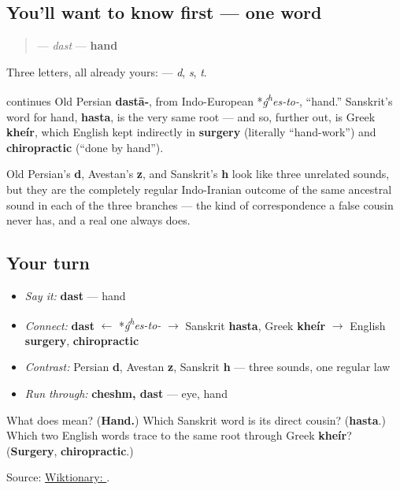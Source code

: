 \subsection*{You'll want to know first — one word}
\begin{quote}
\textbf{} — \emph{dast} — \textbf{hand}
\end{quote}

Three letters, all already yours: \textbf{  } — \emph{d}, \emph{s}, \emph{t}.

\begin{cousinweb}
\textbf{} continues Old Persian \textbf{dastā-}, from Indo-European *\emph{ǵ\textsuperscript{h}es-to-}, “hand.” Sanskrit's word for hand, \textbf{hasta}, is the very same root — and so, further out, is Greek \textbf{kheír}, which English kept indirectly in \textbf{surgery} (literally “hand-work”) and \textbf{chiropractic} (“done by hand”).

Old Persian's \textbf{d}, Avestan's \textbf{z}, and Sanskrit's \textbf{h} look like three unrelated sounds, but they are the completely regular Indo-Iranian outcome of the same ancestral sound in each of the three branches — the kind of correspondence a false cousin never has, and a real one always does.
\end{cousinweb}

\subsection*{Your turn}
\begin{itemize}
\raggedright
  \item \emph{Say it:} \textbf{dast} — hand
  \item \emph{Connect:} \textbf{dast} $\leftarrow$ *\emph{ǵ\textsuperscript{h}es-to-} $\to$ Sanskrit \textbf{hasta}, Greek \textbf{kheír} $\to$ English \textbf{surgery}, \textbf{chiropractic}
  \item \emph{Contrast:} Persian \textbf{d}, Avestan \textbf{z}, Sanskrit \textbf{h} — three sounds, one regular law
  \item \emph{Run through:} \textbf{cheshm, dast} — eye, hand
\end{itemize}

\begin{tcolorbox}[breakable,colback=teal!4,colframe=teal!35!black,title={Before you move on}]
What does \textbf{} mean? (\textbf{Hand.}) Which Sanskrit word is its direct cousin? (\textbf{hasta}.) Which two English words trace to the same root through Greek \textbf{kheír}? (\textbf{Surgery}, \textbf{chiropractic}.)

Source: \href{https://en.wiktionary.org/wiki/\%D8\%AF\%D8\%B3\%D8\%AA}{Wiktionary: }.
\end{tcolorbox}
